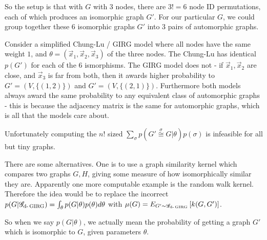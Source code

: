 So the setup is that with $G$ with 3 nodes, there are $3! = 6$ node ID permutations, each of which produces an isomorphic graph $G'$. For our particular $G$, we could group together these 6 isomorphic graphs $G'$ into 3 pairs of automorphic graphs.

Consider a simplified Chung-Lu / GIRG model where all nodes have the same weight $1$, and $\theta = (\vec{x}_1, \vec{x}_2, \vec{x}_3)$ of the three nodes. The Chung-Lu has identical $p(G')$ for each of the 6 ismorphisms. The GIRG  model does not - if $\vec{x}_1, \vec{x}_2$ are close, and $\vec{x}_3$ is far from both, then it awards higher probability to $G' = (V, \{(1,2)\})$ and $G' = (V, \{(2, 1)\})$. Furthermore both models always award the same probability to any equivalent class of automorphic graphs - this is because the adjacency matrix is the same for automorphic graphs, which is all that the models care about.

Unfortunately computing the $n!$ sized $\sum_{\sigma} p(G' \stackrel{\sigma}{\cong} G | \theta) p(\sigma)$ is infeasible for all but tiny graphs. 

There are some alternatives. One is to use a graph similarity kernel which compares two graphs $G, H$, giving some measure of how isomorphically similar they are. Apparently one more computable example is the random walk kernel. Therefore the idea would be to replace the incorrect $p(G | \mathscr{G}_{\text{d-}\operatorname{GIRG}}) = \int_\theta p(G | \theta) p(\theta) d\theta$ with 
$\mu(G) = E_{G' \sim \mathscr{G}_{\text{d-}\operatorname{GIRG}}} \left [ k(G, G') \right ]$.


So when we say $p(G | \theta)$, we actually mean the probability of getting a graph $G'$ which is isomorphic to $G$, given parameters $\theta$.





